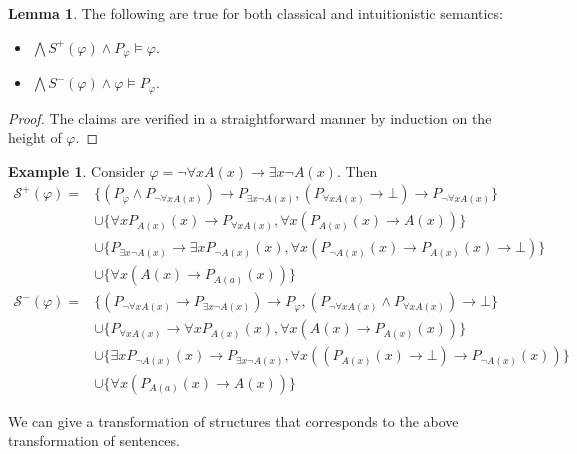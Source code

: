 \documentclass[a4paper,12pt]{report}
\theoremstyle{definition}
\theoremstyle{definition}
\theoremstyle{definition}
\newtheorem{lemma}[theorem]{Lemma}
\theoremstyle{definition}
\theoremstyle{definition}
\theoremstyle{definition}
\newtheorem{example}[theorem]{Example}
\theoremstyle{definition}
\begin{document}
	\begin{lemma}The following are true for both classical and intuitionistic semantics:
		\begin{itemize}
			\item $\bigwedge S^+(\varphi)\wedge P_\varphi\models\varphi$.
			\item $\bigwedge S^-(\varphi)\wedge \varphi\models P_\varphi$.
		\end{itemize}
	\end{lemma}
	
	\begin{proof}
		The claims are verified in a straightforward manner by induction on the height of $\varphi$.
	\end{proof}
	
	\begin{example}
		Consider $\varphi = \neg\forall x A(x)\to \exists x\neg A(x)$. Then
		\begin{align*}
			\mathcal S^+(\varphi) = &\{(P_\varphi\wedge P_{\neg\forall x A(x)})\to P_{\exists x\neg A(x)}, (P_{\forall xA(x)}\to\bot)\to P_{\neg \forall xA(x)}\}\\&\cup\{\forall xP_{A(x)}(x)\to P_{\forall xA(x)}, \forall x(P_{A(x)}(x)\to A(x))\}\\&\cup\{P_{\exists x\neg A(x)}\to \exists xP_{\neg A(x)}(x), \forall x(P_{\neg A(x)}(x)\to P_{A(x)}(x)\to \bot)\}\\&\cup\{\forall x(A(x)\to P_{A(a)}(x))\}\\
			\mathcal S^-(\varphi) = &\{(P_{\neg\forall x A(x)}\to P_{\exists x\neg A(x)})\to P_\varphi,  (P_{\neg \forall xA(x)}\wedge P_{\forall xA(x)})\to\bot\}\\&\cup\{P_{\forall xA(x)}\to \forall xP_{A(x)}(x), \forall x(A(x)\to P_{A(x)}(x))\}\\&\cup\{\exists xP_{\neg A(x)}(x)\to P_{\exists x\neg A(x)}, \forall x((P_{A(x)}(x)\to \bot)\to P_{\neg A(x)}(x))\}\\&\cup\{\forall x(P_{A(a)}(x)\to A(x))\}
		\end{align*}
	\end{example}
	
	We can give a transformation of structures that corresponds to the above transformation of sentences.	
	
\end{document}
